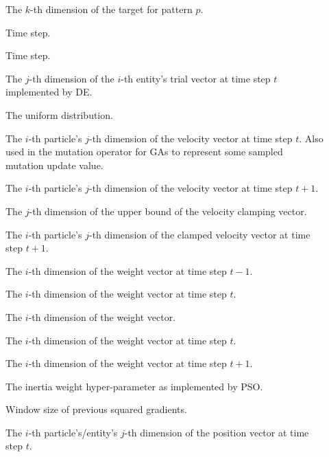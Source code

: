 \begin{description}
	\item [\parbox{2cm}{$t_{k,p}$}] \parbox{12.5cm}{The $k$-th dimension of the target for pattern $p$.}
	\item [\parbox{2cm}{$t$}] \parbox{12.5cm}{Time step.}
	\item [\parbox{2cm}{$T$}] \parbox{12.5cm}{Time step.}
	\item [\parbox{2cm}{$u_{ij}(t)$}] \parbox{12.5cm}{The $j$-th dimension of the $i$-th entity's trial vector at time step $t$ implemented by \acs{DE}.}
	\item [\parbox{2cm}{$U$}] \parbox{12.5cm}{The uniform distribution.}
	\item [\parbox{2cm}{$v_{ij}(t)$}] \parbox{12.5cm}{The $i$-th particle's $j$-th dimension of the velocity vector at time step $t$. Also used in the mutation operator for \acp{GA} to represent some sampled mutation update value.}
	\item [\parbox{2cm}{$v_{ij}(t+1)$}] \parbox{12.5cm}{The $i$-th particle's $j$-th dimension of the velocity vector at time step $t+1$.}
	\item [\parbox{2cm}{$V_{max,j}$}] \parbox{12.5cm}{The $j$-th dimension of the upper bound of the velocity clamping vector.}
	\item [\parbox{2cm}{$v'_{ij}(t+1)$}] \parbox{12.5cm}{The $i$-th particle's $j$-th dimension of the clamped velocity vector at time step $t+1$.}
	\item [\parbox{2cm}{$w_{i}(t-1)$}] \parbox{12.5cm}{The $i$-th dimension of the weight vector at time step $t-1$.}
	\item [\parbox{2cm}{$w_{i}(t)$}] \parbox{12.5cm}{The $i$-th dimension of the weight vector at time step $t$.}
	\item [\parbox{2cm}{$w_{i}$}] \parbox{12.5cm}{The $i$-th dimension of the weight vector.}
	\item [\parbox{2cm}{$w_{t,i}$}] \parbox{12.5cm}{The $i$-th dimension of the weight vector at time step $t$.}
	\item [\parbox{2cm}{$w_{t+1,i}$}] \parbox{12.5cm}{The $i$-th dimension of the weight vector at time step $t+1$.}
	\item [\parbox{2cm}{$w$}] \parbox{12.5cm}{The inertia weight hyper-parameter as implemented by \acs{PSO}.}
	\item [\parbox{2cm}{$W$}] \parbox{12.5cm}{Window size of previous squared gradients.}
	\item [\parbox{2cm}{$x_{ij}(t)$}] \parbox{12.5cm}{The $i$-th particle's/entity's $j$-th dimension of the position vector at time step $t$.}

\end{description}
